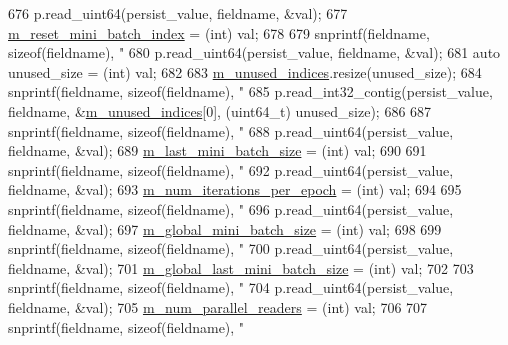 \begin{DoxyCode}
{{{{{{{{{{{{{676     p.read\_uint64(persist\_value, fieldname, &val);
677     \hyperlink{classlbann_1_1generic__data__reader_af29f62579a408d1548a124442bcf181d}{m\_reset\_mini\_batch\_index} = (int) val;
678 
679     snprintf(fieldname, \textcolor{keyword}{sizeof}(fieldname), \textcolor{stringliteral}{"%
680     p.read\_uint64(persist\_value, fieldname, &val);
681     \textcolor{keyword}{auto} unused\_size = (int) val;
682 
683     \hyperlink{classlbann_1_1generic__data__reader_a0bc0ee42e95d23687ddcc30d6c338b19}{m\_unused\_indices}.resize(unused\_size);
684     snprintf(fieldname, \textcolor{keyword}{sizeof}(fieldname), \textcolor{stringliteral}{"%
685     p.read\_int32\_contig(persist\_value, fieldname, &\hyperlink{classlbann_1_1generic__data__reader_a0bc0ee42e95d23687ddcc30d6c338b19}{m\_unused\_indices}[0], (uint64\_t) 
      unused\_size);
686 
687     snprintf(fieldname, \textcolor{keyword}{sizeof}(fieldname), \textcolor{stringliteral}{"%
688     p.read\_uint64(persist\_value, fieldname, &val);
689     \hyperlink{classlbann_1_1generic__data__reader_a241f77b6209de4ae656bc34ad51bb612}{m\_last\_mini\_batch\_size} = (int) val;
690 
691     snprintf(fieldname, \textcolor{keyword}{sizeof}(fieldname), \textcolor{stringliteral}{"%
692     p.read\_uint64(persist\_value, fieldname, &val);
693     \hyperlink{classlbann_1_1generic__data__reader_ab570063483a1f604ca2fc536c3d83de7}{m\_num\_iterations\_per\_epoch} = (int) val;
694 
695     snprintf(fieldname, \textcolor{keyword}{sizeof}(fieldname), \textcolor{stringliteral}{"%
696     p.read\_uint64(persist\_value, fieldname, &val);
697     \hyperlink{classlbann_1_1generic__data__reader_a7cd8fa7b1db9ea3d154a411f36992476}{m\_global\_mini\_batch\_size} = (int) val;
698 
699     snprintf(fieldname, \textcolor{keyword}{sizeof}(fieldname), \textcolor{stringliteral}{"%
700     p.read\_uint64(persist\_value, fieldname, &val);
701     \hyperlink{classlbann_1_1generic__data__reader_a1d6f2d378a3f152e20b3def16f52c003}{m\_global\_last\_mini\_batch\_size} = (int) val;
702 
703     snprintf(fieldname, \textcolor{keyword}{sizeof}(fieldname), \textcolor{stringliteral}{"%
704     p.read\_uint64(persist\_value, fieldname, &val);
705     \hyperlink{classlbann_1_1generic__data__reader_a6eb9b8c7c704374a1e49dce87110455e}{m\_num\_parallel\_readers} = (int) val;
706 
707     snprintf(fieldname, \textcolor{keyword}{sizeof}(fieldname), \textcolor{stringliteral}{"%
}}}}}}}}}}}}}}}}}}}}}
\end{DoxyCode}
